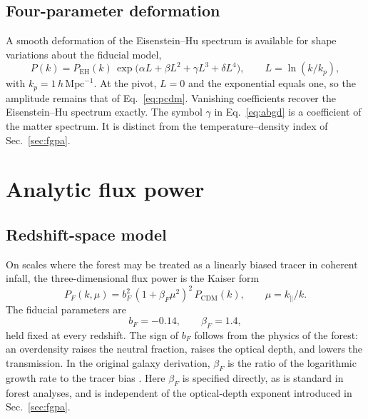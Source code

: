 \documentclass[11pt]{article}
\begin{document}
\subsection{Four-parameter deformation}
\label{sec:abgd}

A smooth deformation of the Eisenstein--Hu spectrum is available for shape variations about the fiducial model,
\begin{equation}
\label{eq:abgd}
P(k)
=
P_\mathrm{EH}(k)\,
\exp\bigl(\alpha L + \beta L^{2} + \gamma L^{3} + \delta L^{4}\bigr),
\qquad
L = \ln(k/k_p),
\end{equation}
with $k_p = 1\,h\,\mathrm{Mpc}^{-1}$.
At the pivot, $L=0$ and the exponential equals one, so the amplitude remains that of Eq.~\eqref{eq:pcdm}.
Vanishing coefficients recover the Eisenstein--Hu spectrum exactly.
The symbol $\gamma$ in Eq.~\eqref{eq:abgd} is a coefficient of the matter spectrum.
It is distinct from the temperature--density index of Sec.~\ref{sec:fgpa}.

\section{Analytic flux power}
\label{sec:kaiser}

\subsection{Redshift-space model}

On scales where the forest may be treated as a linearly biased tracer in coherent infall, the three-dimensional flux power is the Kaiser form \citep{Kaiser:1987qv,McDonald:2001fe}
\begin{equation}
\label{eq:kaiser}
P_F(k,\mu)
=
b_F^{2}\,(1+\beta_F\mu^{2})^{2}\,P_\mathrm{CDM}(k),
\qquad
\mu = k_\parallel/k.
\end{equation}
The fiducial parameters are
\begin{equation}
\label{eq:bias}
b_F = -0.14, \qquad \beta_F = 1.4,
\end{equation}
held fixed at every redshift.
The sign of $b_F$ follows from the physics of the forest: an overdensity raises the neutral fraction, raises the optical depth, and lowers the transmission.
In the original galaxy derivation, $\beta_F$ is the ratio of the logarithmic growth rate to the tracer bias \citep{Kaiser:1987qv}.
Here $\beta_F$ is specified directly, as is standard in forest analyses, and is independent of the optical-depth exponent introduced in Sec.~\ref{sec:fgpa}.
\end{document}
